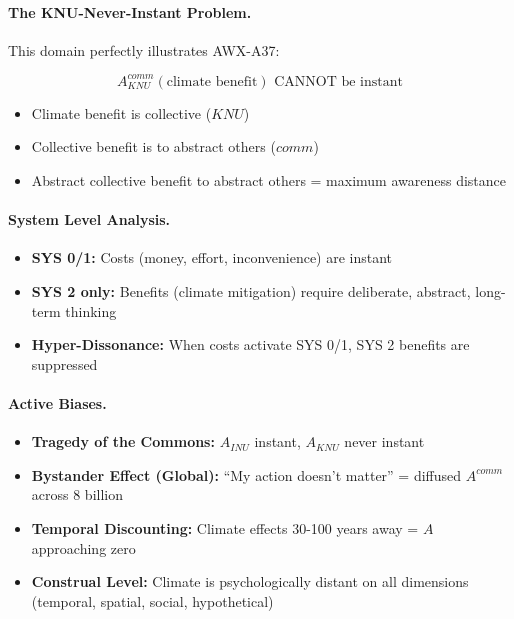 \paragraph{The KNU-Never-Instant Problem.}
This domain perfectly illustrates AWX-A37:

\begin{equation}
A^{comm}_{KNU}(\text{climate benefit}) \text{ CANNOT be instant}
\end{equation}

\begin{itemize}
\item Climate benefit is collective ($KNU$)
\item Collective benefit is to abstract others ($comm$)
\item Abstract collective benefit to abstract others = maximum awareness distance
\end{itemize}

\paragraph{System Level Analysis.}
\begin{itemize}
\item \textbf{SYS 0/1:} Costs (money, effort, inconvenience) are instant
\item \textbf{SYS 2 only:} Benefits (climate mitigation) require deliberate, 
abstract, long-term thinking
\item \textbf{Hyper-Dissonance:} When costs activate SYS 0/1, SYS 2 benefits 
are suppressed
\end{itemize}

\paragraph{Active Biases.}
\begin{itemize}
\item \textbf{Tragedy of the Commons:} $A_{INU}$ instant, $A_{KNU}$ never instant
\item \textbf{Bystander Effect (Global):} ``My action doesn't matter'' = 
diffused $A^{comm}$ across 8 billion
\item \textbf{Temporal Discounting:} Climate effects 30-100 years away = 
$A$ approaching zero
\item \textbf{Construal Level:} Climate is psychologically distant on all 
dimensions (temporal, spatial, social, hypothetical)
\end{itemize}

